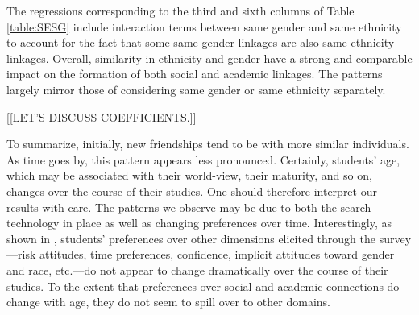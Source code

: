 \documentclass[12pt,letterpaper,english]{article}
\begin{document}
The regressions corresponding to the third and sixth columns of Table \ref{table:SESG} include interaction terms between same gender and same ethnicity to account for the fact that some same-gender linkages are also same-ethnicity linkages. Overall, similarity in ethnicity and gender have a strong and comparable impact on the formation of both social and academic linkages. The patterns largely mirror those of considering same gender or same ethnicity separately. 

[[LET'S DISCUSS COEFFICIENTS.]]

To summarize, initially, new friendships tend to be with more similar individuals. As time goes by, this pattern appears less pronounced. Certainly, students' age, which may be associated with their world-view, their maturity, and so on, changes over the course of their studies. One should therefore interpret our results with care. The patterns we observe may be due to both the search technology in place as well as changing preferences over time. Interestingly, as shown in \citet{gillen2019experimenting}, students' preferences over other dimensions elicited through the survey---risk attitudes, time preferences, confidence, implicit attitudes toward gender and race, etc.---do not appear to change dramatically over the course of their studies. To the extent that preferences over social and academic connections do change with age, they do not seem to spill over to other domains.






	


\end{document}
